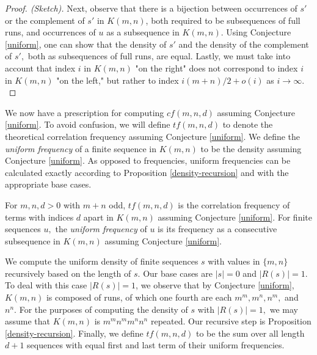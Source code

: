 \documentclass[11pt]{amsart} %
\begin{document}
\begin{proof}[Proof. (Sketch)]
Next, observe that there is a bijection between occurrences of $s'$ or the complement of $s'$ in $K(m,n)$, both required to be subsequences of full runs, and occurrences of $u$ as a subsequence in $K(m,n).$ Using Conjecture \ref{uniform}, one can show that the density of $s'$ and the density of the complement of $s',$ both as subsequences of full runs, are equal. Lastly, we must take into account that index $i$ in $K(m,n)$ "on the right" does not correspond to index $i$ in $K(m,n)$ "on the left," but rather to index $ i (m+n)/2 + o(i)$ as $i \rightarrow \infty.$
\end{proof}


We now have a prescription for computing $cf(m,n,d)$ assuming Conjecture \ref{uniform}. To avoid confusion, we will define $tf(m, n, d)$ to denote the theoretical correlation frequency assuming Conjecture \ref{uniform}. We define the \textit{uniform frequency} of a finite sequence in $K(m, n)$ to be the density assuming Conjecture \ref{uniform}. As opposed to frequencies, uniform frequencies can be calculated exactly according to Proposition \ref{density-recursion} and with the appropriate base cases. 

\begin{definition} For $m, n, d > 0$ with $m+n$ odd, $tf(m,n,d)$ is the correlation frequency of terms with indices $d$ apart in $K(m,n)$ assuming Conjecture \ref{uniform}. For finite sequences $u,$ the \textit{uniform frequency} of $u$ is its frequency as a consecutive subsequence in $K(m,n)$ assuming Conjecture \ref{uniform}. \end{definition}

We compute the uniform density of finite sequences $s$ with values in $\{m,n\}$ recursively based on the length of $s.$ Our base cases are $|s| = 0$ and $|R(s)| = 1$. To deal with this case $|R(s)| = 1$, we observe that by Conjecture \ref{uniform}, $K(m,n)$ is composed of runs, of which one fourth are each $m^m, m^n, n^m,$ and $n^n.$ For the purposes of computing the density of $s$ with $|R(s)| = 1,$ we may assume that $K(m,n)$ is $m^mn^mm^nn^n$ repeated. Our recursive step is Proposition \ref{density-recursion}. Finally, we define $tf(m, n, d)$ to be the sum over all length $d+1$ sequences with equal first and last term of their uniform frequencies.
\end{document}
